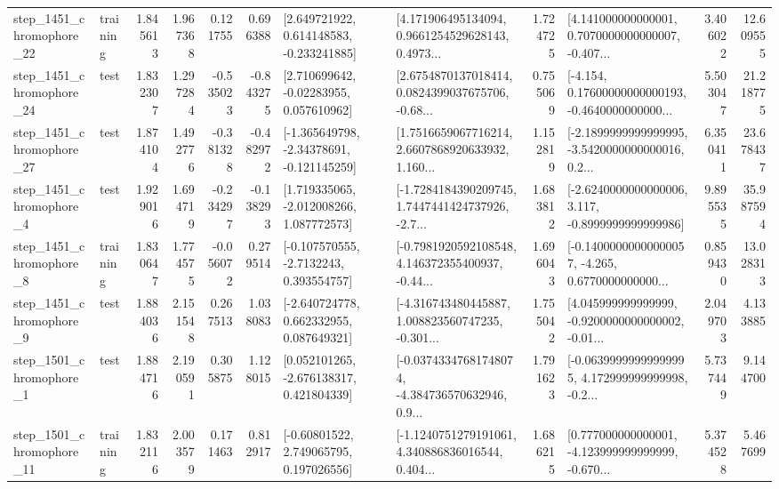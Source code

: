 \begin{tabular}{llrrrrllrlrr}
 step\_1451\_chromophore\_22 &  training &      1.845613 &    1.967368 &      0.121755 &  0.696388 &    [2.649721922, 0.614148583, -0.233241885] &  [4.171906495134094, 0.9661254529628143, 0.4973... &       1.724725 &  [4.141000000000001, 0.7070000000000007, -0.407... &            3.406022 &         12.609555 \\
 step\_1451\_chromophore\_24 &      test &      1.832307 &    1.297284 &     -0.535023 & -0.843275 &     [2.710699642, -0.02283955, 0.057610962] &  [2.6754870137018414, 0.0824399037675706, -0.68... &       0.755069 &  [-4.154, 0.17600000000000193, -0.4640000000000... &            5.503047 &         21.218775 \\
 step\_1451\_chromophore\_27 &      test &      1.874104 &    1.492776 &     -0.381328 & -0.482972 &   [-1.365649798, -2.34378691, -0.121145259] &  [1.7516659067716214, 2.6607868920633932, 1.160... &       1.152819 &  [-2.1899999999999995, -3.5420000000000016, 0.2... &            6.350411 &         23.678437 \\
  step\_1451\_chromophore\_4 &      test &      1.929016 &    1.694719 &     -0.234297 & -0.138293 &    [1.719335065, -2.012008266, 1.087772573] &  [-1.7284184390209745, 1.7447441424737926, -2.7... &       1.683812 &  [-2.6240000000000006, 3.117, -0.8999999999999986] &            9.895535 &         35.987594 \\
  step\_1451\_chromophore\_8 &  training &      1.830647 &    1.774575 &     -0.056072 &  0.279514 &     [-0.107570555, -2.7132243, 0.393554757] &  [-0.7981920592108548, 4.146372355400937, -0.44... &       1.696043 &  [-0.14000000000000057, -4.265, 0.6770000000000... &            0.859430 &         13.028313 \\
  step\_1451\_chromophore\_9 &      test &      1.884036 &    2.151548 &      0.267513 &  1.038083 &    [-2.640724778, 0.662332955, 0.087649321] &  [-4.316743480445887, 1.008823560747235, -0.301... &       1.755042 &  [4.045999999999999, -0.9200000000000002, -0.01... &            2.049703 &          4.133885 \\
  step\_1501\_chromophore\_1 &      test &      1.884716 &    2.190591 &      0.305875 &  1.128015 &    [0.052101265, -2.676138317, 0.421804339] &  [-0.03743347681748074, -4.384736570632946, 0.9... &       1.791623 &  [-0.06399999999999995, 4.172999999999998, -0.2... &            5.737449 &          9.144700 \\
 step\_1501\_chromophore\_11 &  training &      1.832116 &    2.003579 &      0.171463 &  0.812917 &     [-0.60801522, 2.749065795, 0.197026556] &  [-1.1240751279191061, 4.340886836016544, 0.404... &       1.686215 &  [0.777000000000001, -4.123999999999999, -0.670... &            5.374528 &          5.467699 \\

\end{tabular}
